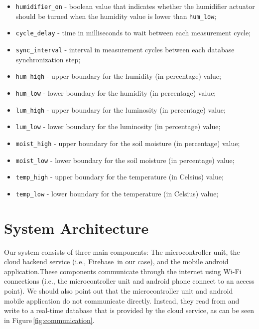 \documentclass{article}
\begin{document}
\begin{itemize}
    \item \texttt{humidifier\_on} - boolean value that indicates whether the
    humidifier actuator should be turned when the humidity value is lower than
    \texttt{hum\_low};
    \item \texttt{cycle\_delay} - time in milliseconds to wait between each
    measurement cycle;
    \item \texttt{sync\_interval} - interval in measurement cycles between each
    database synchronization step;
    \item \texttt{hum\_high} - upper boundary for the humidity (in percentage)
    value;
    \item \texttt{hum\_low} - lower boundary for the humidity (in percentage)
    value;
    \item \texttt{lum\_high} - upper boundary for the luminosity (in percentage)
    value;
    \item \texttt{lum\_low} - lower boundary for the luminosity (in percentage)
    value;
    \item \texttt{moist\_high} - upper boundary for the soil moisture (in
    percentage) value;
    \item \texttt{moist\_low} - lower boundary for the soil moisture (in
    percentage) value;
    \item \texttt{temp\_high} - upper boundary for the temperature (in Celsius)
    value;
    \item \texttt{temp\_low} - lower boundary for the temperature (in Celsius)
    value;
\end{itemize}



\section{System Architecture}\label{sec:architecture}


Our system consists of three main components: The microcontroller unit, the
cloud backend service (i.e., Firebase\,\cite{firebase} in our case), and the
mobile android application.These components communicate through the internet
using Wi-Fi connections (i.e., the microcontroller  unit and android phone
connect to an access point). We should also point out that the microcontroller
unit and android mobile application do not communicate directly. Instead, they
read from and write to a real-time database that is provided by the cloud
service, as can be seen in Figure\,\ref{fig:communication}.
\end{document}
